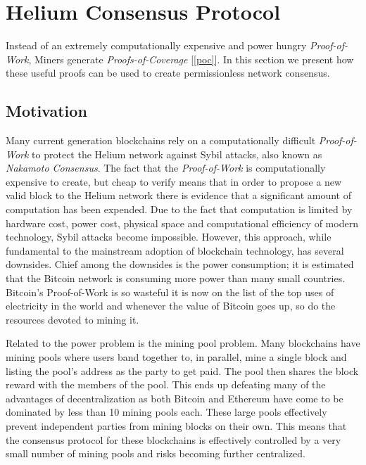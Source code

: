 \documentclass[10pt, nonatbib, nocopyrightspace, reprint]{sigplanconf}
\newcommand{\secref}[1]{[\autoref{#1}]}
\begin{document}
\section{Helium Consensus Protocol}\label{consensus}

Instead of an extremely computationally expensive and power hungry \emph{Proof-of-Work}, Miners generate \emph{Proofs-of-Coverage} \secref{poc}. In this section we present how these useful proofs can be used to create permissionless network consensus.

\subsection{Motivation}

Many current generation blockchains rely on a computationally difficult \emph{Proof-of-Work} to protect the Helium network against Sybil attacks, also known as \emph{Nakamoto Consensus}. The fact that the \emph{Proof-of-Work} is computationally expensive to create, but cheap to verify means that in order to propose a new valid block to the Helium network there is evidence that a significant amount of computation has been expended. Due to the fact that computation is limited by hardware cost, power cost, physical space and computational efficiency of modern technology, Sybil attacks become impossible. However, this approach, while fundamental to the mainstream adoption of blockchain technology, has several downsides. Chief among the downsides is the power consumption; it is estimated that the Bitcoin network is consuming more power than many small countries. Bitcoin's Proof-of-Work is so wasteful it is now on the list of the top uses of electricity in the world and whenever the value of Bitcoin goes up, so do the resources devoted to mining it.

Related to the power problem is the mining pool problem. Many blockchains have mining pools where users band together to, in parallel, mine a single block and listing the pool's address as the party to get paid. The pool then shares the block reward with the members of the pool. This ends up defeating many of the advantages of decentralization as both Bitcoin and Ethereum have come to be dominated by less than 10 mining pools each. These large pools effectively prevent independent parties from mining blocks on their own. This means that the consensus protocol for these blockchains is effectively controlled by a very small number of mining pools and risks becoming further centralized.
\end{document}
